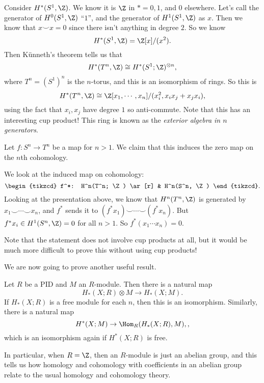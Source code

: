\documentclass[a4paper]{article}
\theoremstyle{definition}
\begin{document}
\begin{eg}
  Consider $H^*(S^1, \Z)$. We know it is $\Z$ in $* = 0, 1$, and $0$ elsewhere. Let's call the generator of $H^0(S^1, \Z)$ ``$1$'', and the generator of $H^1(S^1, \Z)$ as $x$. Then we know that $x \smile x = 0$ since there isn't anything in degree $2$. So we know
  \[
    H^*(S^1, \Z) = \Z[x]/(x^2).
  \]
  Then K\"unneth's theorem tells us that
  \[
    H^*(T^n, \Z) \cong H^*(S^1; \Z)^{\otimes n},
  \]
  where $T^n = (S^1)^n$ is the $n$-torus, and this is an isomorphism of rings. So this is
  \[
    H^*(T^n, \Z) \cong \Z[x_1, \cdots, x_n]/(x_i^2, x_i x_j + x_j x_i),
  \]
  using the fact that $x_i, x_j$ have degree $1$ so anti-commute. Note that this has an interesting cup product! This ring is known as the \emph{exterior algebra in $n$ generators}.
\end{eg}

\begin{eg}
  Let $f: S^n \to T^n$ be a map for $n > 1$. We claim that this induces the zero map on the $n$th cohomology.

  We look at the induced map on cohomology:
  \[
    \begin{tikzcd}
      f^*: H^n(T^n; \Z) \ar[r] & H^n(S^n, \Z)
    \end{tikzcd}.
  \]
  Looking at the presentation above, we know that $H^n(T^n, \Z)$ is generated by $x_1 \smile \cdots \smile x_n$, and $f^*$ sends it to $(f^* x_1) \smile \cdots \smile (f^* x_n)$. But $f^*x_i \in H^1(S^n, \Z) = 0$ for all $n > 1$. So $f^* (x_1 \cdots x_n) = 0$.
\end{eg}
Note that the statement does not involve cup products at all, but it would be much more difficult to prove this without using cup products!

We are now going to prove another useful result.
\begin{thm}
  Let $R$ be a PID and $M$ an $R$-module. Then there is a natural map
  \[
    H_*(X; R)\otimes M \to H_*(X; M).
  \]
  If $H_*(X; R)$ is a free module for each $n$, then this is an isomorphism. Similarly, there is a natural map
  \[
    H^*(X; M) \to \Hom_R(H_*(X; R), M),,
  \]
  which is an isomorphism again if $H^*(X; R)$ is free.
\end{thm}
In particular, when $R = \Z$, then an $R$-module is just an abelian group, and this tells us how homology and cohomology with coefficients in an abelian group relate to the usual homology and cohomology theory.
\end{document}

